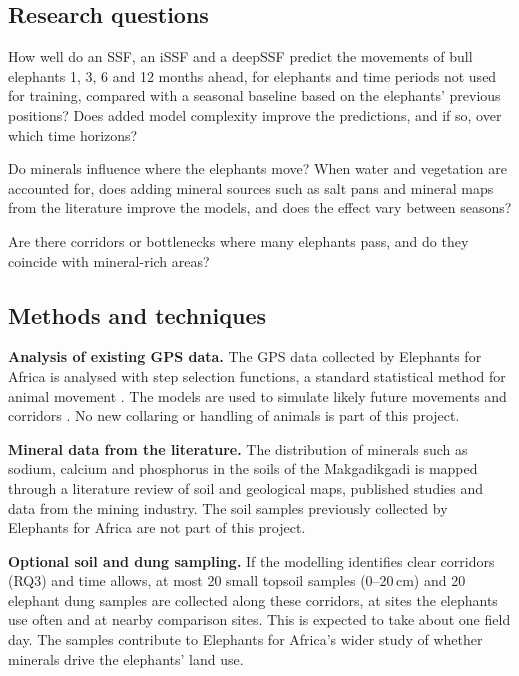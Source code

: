 \documentclass[12pt,a4paper]{article}
\begin{document}
\subsection{Research questions}
\begin{description}[leftmargin=1.2cm,labelindent=0pt,labelwidth=1cm,font=\normalfont]
\item[RQ1:] How well do an SSF, an iSSF and a deepSSF predict the movements of bull elephants 1, 3, 6 and 12 months ahead, for elephants and time periods not used for training, compared with a seasonal baseline based on the elephants' previous positions? Does added model complexity improve the predictions, and if so, over which time horizons?
\item[RQ2:] Do minerals influence where the elephants move? When water and vegetation are accounted for, does adding mineral sources such as salt pans and mineral maps from the literature improve the models, and does the effect vary between seasons?
\item[RQ3:] Are there corridors or bottlenecks where many elephants pass, and do they coincide with mineral-rich areas?
\end{description}

\subsection{Methods and techniques}

\textbf{Analysis of existing GPS data.} The GPS data collected by Elephants for Africa is analysed with step selection functions, a standard statistical method for animal movement \cite{fortin,avgar}. The models are used to simulate likely future movements and corridors \cite{signer,osipova}. No new collaring or handling of animals is part of this project.

\textbf{Mineral data from the literature.} The distribution of minerals such as sodium, calcium and phosphorus in the soils of the Makgadikgadi is mapped through a literature review of soil and geological maps, published studies and data from the mining industry. The soil samples previously collected by Elephants for Africa are not part of this project.

\textbf{Optional soil and dung sampling.} If the modelling identifies clear corridors (RQ3) and time allows, at most 20 small topsoil samples (0--20\,cm) and 20 elephant dung samples are collected along these corridors, at sites the elephants use often and at nearby comparison sites. This is expected to take about one field day. The samples contribute to Elephants for Africa's wider study of whether minerals drive the elephants' land use.
\end{document}
